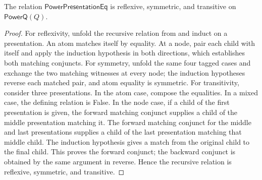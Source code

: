 \begin{lemma}
The relation $\mathsf{PowerPresentationEq}$ is reflexive, symmetric, and
transitive on $\mathsf{PowerQ}(Q)$.
\end{lemma}
\begin{proof}
For reflexivity, unfold the recursive relation from
 and induct on a presentation.  An atom matches
itself by equality.  At a node, pair each child with itself and apply the
induction hypothesis in both directions, which establishes both matching
conjuncts.  For symmetry, unfold the same four tagged cases and exchange the
two matching witnesses at every node; the induction hypotheses reverse each
matched pair, and atom equality is symmetric.  For transitivity, consider
three presentations.  In the atom case, compose the equalities.  In a mixed
case, the defining relation is False.  In the node case, if a child of the
first presentation is given, the forward matching conjunct supplies a child
of the middle presentation matching it.  The forward matching conjunct for
the middle and last presentations supplies a child of the last presentation
matching that middle child.  The induction hypothesis gives a match from the
original child to the final child.  This proves the forward conjunct; the
backward conjunct is obtained by the same argument in reverse.  Hence the
recursive relation is reflexive, symmetric, and transitive.
\end{proof}
